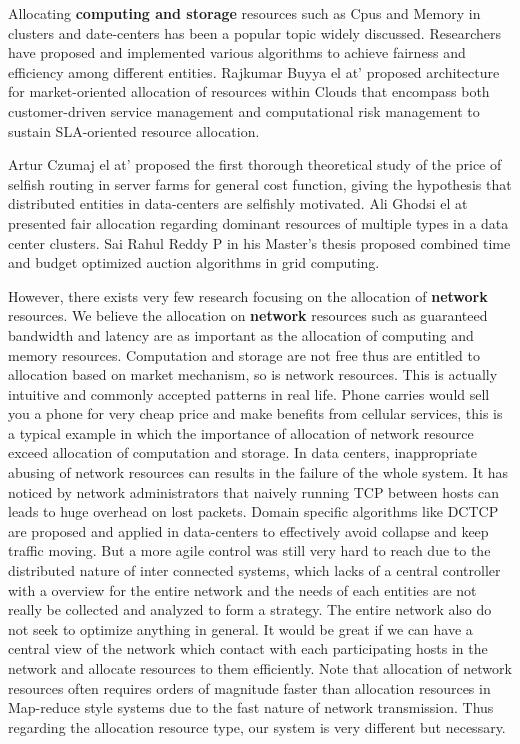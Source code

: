 \documentclass[a4paper,11pt,twocolumn]{article}
\begin{document}
Allocating \textbf{computing and storage} resources such as Cpus and Memory
 in clusters and date-centers has been a popular topic widely discussed. Researchers have proposed and implemented
various algorithms to achieve fairness and efficiency among different entities. 
Rajkumar Buyya el at' \cite{Rajkumar} proposed architecture for market-oriented allocation of 
resources within Clouds that encompass both customer-driven service management 
and computational risk management to sustain SLA-oriented resource allocation. 

Artur   Czumaj el at'\cite{Artur} proposed  the first thorough theoretical study of the
price of selfish routing in server farms for general cost function, giving the hypothesis that 
distributed entities in data-centers are selfishly motivated.  
Ali Ghodsi el at\cite{Ali} presented fair allocation regarding dominant resources of multiple types
in a data center clusters.
Sai Rahul Reddy P\cite{Sai} in his Master's thesis proposed combined time and budget optimized auction 
algorithms in grid computing. 

However, there exists very few research focusing on the allocation
of \textbf{network} resources. We believe the allocation on \textbf{network} resources such as guaranteed bandwidth and 
latency are as important as the allocation of computing and memory resources. Computation and storage are not free
thus are entitled to allocation based on market mechanism, so is network resources. This is actually intuitive 
and commonly accepted patterns in real life. Phone carries would sell you a phone for very cheap price and make 
benefits from cellular services, this is a typical example in which the importance of allocation of network resource
 exceed allocation of computation and storage. In data centers, inappropriate abusing of network resources can results
in the failure of the whole system. It has noticed by network administrators that naively running TCP
between hosts can leads to huge overhead on lost packets. Domain specific algorithms like DCTCP\cite{Mohammad} are proposed and applied
in data-centers to effectively avoid collapse and keep traffic moving. But a more agile control was still very hard
to reach due to the distributed nature of inter connected systems, which lacks of a central controller with
a overview for the entire network and the needs of each entities are not really be collected and analyzed to form a strategy. The entire network also do not seek to optimize anything in general.
It would be great if we can have a central view of the network which contact with each participating hosts in the network and allocate resources to them efficiently. Note that
allocation of network resources often requires orders of  magnitude faster than allocation resources in Map-reduce style 
systems due to the fast nature of network transmission.  Thus regarding the allocation resource type, our system is very different but necessary.    
\end{document}
